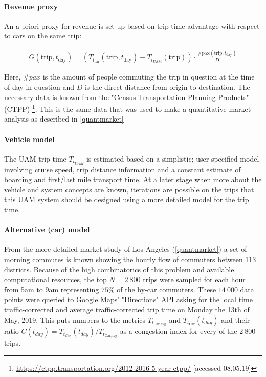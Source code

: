 \paragraph{Revenue proxy}

An a priori proxy for revenue is set up based on trip time advantage with respect to cars on the same trip:

\begin{align} \label{eq:gainmetric}
    G(\text{trip}, t_\text{day}) = \left( T_{t_\text{car}}(\text{trip}, t_\text{day}) - T_{{t}_\text{UAM}}(\text{trip}) \right) \cdot \frac{\#\text{pax}(\text{trip},t_\text{day})}{D}
\end{align}

Here, $\#pax$ is the amount of people commuting the trip in question at the time of day in question and $D$ is the direct distance from origin to destination. The necessary data is known from the "Census Transportation Planning Products" (CTPP) \footnote{\url{https://ctpp.transportation.org/2012-2016-5-year-ctpp/} [accessed 08.05.19]}. This is the same data that was used to make a quantitative market analysis as described in \autoref{quantmarket}

\paragraph{Vehicle model}

The UAM trip time $T_{{t}_{UAM}}$ is estimated based on a simplistic; user specified model involving cruise speed, trip distance information and a constant estimate of boarding and first/last mile transport time. At a later stage when more about the vehicle and system concepts are known, iterations are possible on the trips that this UAM system should be designed using a more detailed model for the trip time.


\paragraph{Alternative (car) model}

From the more detailed market study of Los Angeles (\autoref{quantmarket}) a set of morning commutes is known showing the hourly flow of commuters between 113 districts. Because of the high combinatorics of this problem and available computational resources, the top $N = 2\ 800$ trips were sampled for each hour from 5am to 9am representing $75\%$ of the by-car commuters. These $14\ 000$ data points were queried to Google Maps' "Directions" API asking for the local time traffic-corrected and average traffic-corrected trip time on Monday the 13th of May, 2019. This puts numbers to the metrics $T_{t_\text{Car,avg}}$ and $T_{t_{\text{Car} }}(t_{day})$ and their ratio $C(t_{day}) = T_{t_{Car}}(t_{day}) / T_{t_\text{Car,avg}}$ as a congestion index for every of the $2\ 800$ trips.



